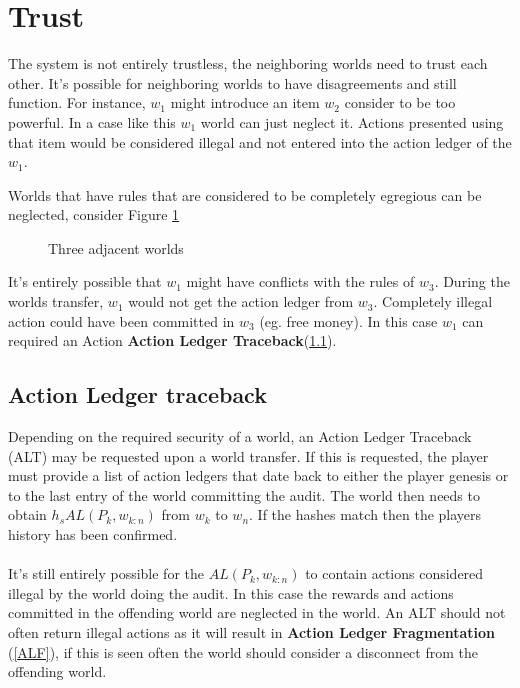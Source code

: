 \documentclass[runningheads,a4paper]{llncs}
\begin{document}

\section{Trust} %
The system is not entirely trustless, the neighboring worlds need to trust each other. It's possible for neighboring worlds to have disagreements and still function. For instance, $w_1$ might introduce an item $w_2$ consider to be too powerful. In a case like this $w_1$ world can just neglect it. Actions presented using that item would be considered illegal and not entered into the action ledger of the $w_1$.

Worlds that have rules that are considered to be completely egregious can be neglected, consider Figure \ref{ThreeW} 

\begin{figure}
\caption{Three adjacent worlds}
\label{ThreeW}
\begin{center}
\end{center}
\end{figure}

It's entirely possible that $w_1$ might have conflicts with the rules of $w_3$. During the worlds transfer, $w_1$ would not get the action ledger from $w_3$. Completely illegal action could have been committed in $w_3$ (eg. free money). In this case $w_1$ can required an Action \textbf{Action Ledger Traceback}(\ref{ALT}).

\subsection{Action Ledger traceback}
\label{ALT}
Depending on the required security of a world, an Action Ledger Traceback (ALT) may be requested upon a world transfer. If this is requested, the player must provide a list of action ledgers that date back to either the player genesis or to the last entry of the world committing the audit. The world then needs to obtain $h_s{AL(P_k, w_{k:n})}$ from $w_k$ to $w_n$. If the hashes match then the players history has been confirmed. 
\\\\
It's still entirely possible for the $AL(P_k, w_{k:n})$ to contain actions considered illegal by the world doing the audit. In this case the rewards and actions committed in the offending world are neglected in the world. An ALT should not often return illegal actions as it will result in \textbf{Action Ledger Fragmentation} (\ref{ALF}), if this is seen often the world should consider a disconnect from the offending world. 
\end{document}
